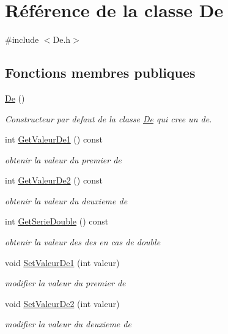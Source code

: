 \hypertarget{classDe}{}\section{Référence de la classe De}
\label{classDe}


{\ttfamily \#include $<$De.\+h$>$}

\subsection*{Fonctions membres publiques}
\begin{DoxyCompactItemize}
\item 
\hyperlink{classDe_ae6ca2b7255a0bf6dabf745f1f7ca7b40}{De} ()
\begin{DoxyCompactList}\small\item\em Constructeur par defaut de la classe \hyperlink{classDe}{De} qui cree un de. \end{DoxyCompactList}\item 
int \hyperlink{classDe_ae12aeb8230c70da587b5c9087e186871}{Get\+Valeur\+De1} () const 
\begin{DoxyCompactList}\small\item\em obtenir la valeur du premier de \end{DoxyCompactList}\item 
int \hyperlink{classDe_af52bedc1c245414ce82e26a7d5ec10db}{Get\+Valeur\+De2} () const 
\begin{DoxyCompactList}\small\item\em obtenir la valeur du deuxieme de \end{DoxyCompactList}\item 
int \hyperlink{classDe_a2cc67911a29115a7631ca549f4a275a8}{Get\+Serie\+Double} () const 
\begin{DoxyCompactList}\small\item\em obtenir la valeur des des en cas de double \end{DoxyCompactList}\item 
void \hyperlink{classDe_a8b105bd1a2cb4357da368cdf744b058d}{Set\+Valeur\+De1} (int valeur)
\begin{DoxyCompactList}\small\item\em modifier la valeur du premier de \end{DoxyCompactList}\item 
void \hyperlink{classDe_a5f2ec1f957e50b5a1ad677e91835de5e}{Set\+Valeur\+De2} (int valeur)
\begin{DoxyCompactList}\small\item\em modifier la valeur du deuxieme de \end{DoxyCompactList}\item 

\end{DoxyCompactItemize}
